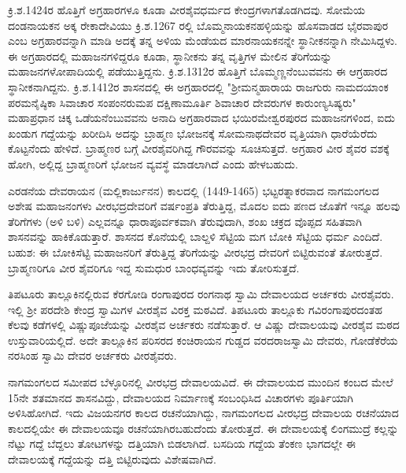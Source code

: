 ಕ್ರಿ.ಶ.1424ರ ಹೊತ್ತಿಗೆ ಅಗ್ರಹಾರಗಳೂ ಕೂಡಾ ವೀರಶೈವಧರ್ಮದ ಕೇಂದ್ರಗಳಾಗತೊಡಗಿದವು. ಸೋಮೆಯ ದಂಡನಾಯಕನ ಅಕ್ಕ ರೇಕಾದೇವಿಯು ಕ್ರಿ.ಶ.1267 ರಲ್ಲಿ ಬೊಮ್ಮನಾಯಕನಹಳ್ಳಿಯನ್ನು ಹೊಸವಾಡದ ಭೈರವಾಪುರ ಎಂಬ ಅಗ್ರಹಾರವನ್ನಾಗಿ ಮಾಡಿ ಅದಕ್ಕೆ ತನ್ನ ಅಳಿಯ ಮೆಂಡೆಯದ ಮಾರನಾಯಕನನ್ನೇ ಸ್ಥಾನೀಕನನ್ನಾಗಿ ನೇಮಿಸಿದ್ದಳು. ಈ ಅಗ್ರಹಾರದಲ್ಲಿ ಮಹಾಜನಗಳಿದ್ದರೂ ಕೂಡಾ, ಸ್ಥಾನೀಕನು ತನ್ನ ವೃತ್ತಿಗಳ ಮೇಲಿನ ತೆರಿಗೆಯನ್ನು ಮಹಾಜನಗಳೋಪಾದಿಯಲ್ಲಿ ಪಡೆಯುತ್ತಿದ್ದನು. ಕ್ರಿ.ಶ.1312ರ ಹೊತ್ತಿಗೆ ಬೊಮ್ಮಣ್ಣನೆಂಬುವವನು ಈ ಆಗ್ರಹಾರದ ಸ್ಥಾನೀಕನಾಗಿದ್ದನು. ಕ್ರಿ.ಶ.\break 1412ರ ಶಾಸನದಲ್ಲಿ ಈ ಅಗ್ರಹಾರದಲ್ಲಿ "ಶ‍್ರೀಮನ್ಮಹಾರಾಯ ರಾಜಗುರು ನಾಮದಯಾಂಕ ಪರಮನೈಷ್ಠಿಕಾ ಸಿವಾಚಾರ ಸಂಪಂನರುಮಪ ದಕ್ಷಿಣಾಮೂರ್ತಿ ಶಿವಾಚಾರ ದೇವರುಗಳ ಕಾರುಂಣ್ಯಸಿಷ್ಯರು" ಮಹಾಪ್ರಧಾನ ಚಿಕ್ಕ ಒಡೆಯನೆಂಬುವವನು ಅನಾದಿ ಅಗ್ರಹಾರ\-ವಾದ ಭಯಿರಮೇಶ್ವರಪುರದ ಮಹಾಜನಗಳಿಂದ, ಐದು ಖಂಡುಗ ಗದ್ದೆಯನ್ನು ಖರೀದಿಸಿ ಅದನ್ನು ಬ್ರಾಹ್ಮಣ ಭೋಜನಕ್ಕೆ ಸೋಮನಾಥದೇವರ ವೃತ್ತಿಯಾಗಿ ಧಾರೆಯೆರೆದು ಕೊಟ್ಟನೆಂದು ಹೇಳಿದೆ. ಬ್ರಾಹ್ಮಣರ ಬಗ್ಗೆ ವೀರಶೈವರಿಗಿದ್ದ ಗೌರವವನ್ನು ಸೂಚಿಸುತ್ತದೆ. ಅಗ್ರಹಾರ ವೀರ ಶೈವರ ವಶಕ್ಕೆ ಹೋಗಿ, ಅಲ್ಲಿದ್ದ ಬ್ರಾಹ್ಮಣರಿಗೆ ಭೋಜನ ವ್ಯವಸ್ಥೆ ಮಾಡಲಾಗಿದೆ ಎಂದು ಹೇಳಬಹುದು.

ಎರಡನೆಯ ದೇವರಾಯನ (ಮಲ್ಲಿಕಾರ್ಜುನನ) ಕಾಲದಲ್ಲಿ (1449-1465) ಭಟ್ಟರತ್ನಾಕರವಾದ ನಾಗಮಂಗಲದ ಅಶೇಷ ಮಹಾಜನಂಗಳು ವೀರಭದ್ರದೇವರಿಗೆ ವರ್ಷಂಪ್ರತಿ ತೆರುತ್ತಿದ್ದ, ಮೊದಲ ಐದು ಪಣದ ಜೊತೆಗೆ ಇನ್ನೂ ಹಲವು ತೆರಿಗೆಗಳು (ಅಳಿ ಬಳಿ) ಎಲ್ಲವನ್ನೂ ಧಾರಾಪೂರ್ವಕವಾಗಿ ತೆರುವುದಾಗಿ, ಶಂಖ ಚಕ್ರದ ವೊಪ್ಪದ ಸಹಿತವಾಗಿ ಶಾಸನವನ್ನು ಹಾಕಿಕೊಡುತ್ತಾರೆ. ಶಾಸನದ ಕೊನೆಯಲ್ಲಿ ಬಾಲ್ದಳಿ ಸೆಟ್ಟಿಯ ಮಗ ಬೋಕಿ ಸೆಟ್ಟಿಯ ಧರ್ಮ ಎಂದಿದೆ. ಬಹುಶ: ಈ ಬೋಕಿಸೆಟ್ಟಿ ಮಹಾಜನರಿಗೆ ತೆರುತ್ತಿದ್ದ ತೆರಿಗೆಯನ್ನು ವೀರಭದ್ರ ದೇವರಿಗೆ ಬಿಟ್ಟಿರುವಂತೆ ತೋರುತ್ತದೆ. ಬ್ರಾಹ್ಮಣರಿಗೂ ವೀರ ಶೈವರಿಗೂ ಇದ್ದ ಸುಮಧುರ ಬಾಂಧವ್ಯವನ್ನು ಇದು ತೋರಿಸುತ್ತದೆ.

ತಿಪಟೂರು ತಾಲ್ಲೂಕಿನಲ್ಲಿರುವ ಕೆರಗೋಡಿ ರಂಗಾಪುರದ ರಂಗನಾಥ ಸ್ವಾಮಿ ದೇವಾಲಯದ ಅರ್ಚಕರು ವೀರಶೈವರು. ಇಲ್ಲಿ ಶ‍್ರೀ ಪರದೇಶಿ ಕೇಂದ್ರ ಸ್ವಾಮಿಗಳ ವೀರಶೈವ ವಿರಕ್ತ ಮಠವಿದೆ. ತಿಪಟೂರು ತಾಲ್ಲೂಕು ಗವಿರಂಗಾಪುರದಂತಹ ಕೆಲವು ಕಡೆಗಳಲ್ಲಿ ವಿಷ್ಣುಪೂಜೆಯನ್ನು ವೀರಶೈವ ಅರ್ಚಕರು ನಡೆಸುತ್ತಾರೆ. ಆ ವಿಷ್ಣು ದೇವಾಲಯವು ವೀರಶೈವ ಮಠದ ಉಸ್ತುವಾರಿಯಲ್ಲಿದೆ. ಅದೇ ತಾಲ್ಲೂಕಿನ ಪರಿಸರದ ಕಂಚಿರಾಯನ ಗುಡ್ಡದ ವರದರಾಜಸ್ವಾಮಿ ದೇವರು, ಗೋಡೆಕೆರೆಯ ನರಸಿಂಹ ಸ್ವಾಮಿ ದೇವರ ಅರ್ಚಕರು ವೀರಶೈವರು.

ನಾಗಮಂಗಲದ ಸಮೀಪದ ಬೆಳ್ಳೂರಿನಲ್ಲಿ ವೀರಭದ್ರ ದೇವಾಲಯವಿದೆ. ಈ ದೇವಾಲಯದ ಮುಂದಿನ ಕಂಬದ ಮೇಲೆ 15ನೇ ಶತಮಾನದ ಶಾಸನವಿದ್ದು, ದೇವಾಲಯದ ನಿರ್ಮಾಣಕ್ಕೆ ಸಂಬಂಧಿಸಿದ ವಿಚಾರಗಳು ಪೂರ್ತಿಯಾಗಿ ಅಳಿಸಿಹೋಗಿದೆ. ಇದು ವಿಜಯನಗರ ಕಾಲದ ರಚನೆಯಾಗಿದ್ದು, ನಾಗಮಂಗಲದ ವೀರಭದ್ರ ದೇವಾಲಯ ರಚನೆಯಾದ ಕಾಲದಲ್ಲಿಯೇ ಈ ದೇವಾಲಯವೂ ರಚನೆಯಾಗಿರಬಹುದೆಂದು ತೋರುತ್ತದೆ. ಈ ದೇವಾಲಯಕ್ಕೆ ಲಿಂಗಮುದ್ರೆ ಕಲ್ಲನ್ನು ನೆಟ್ಟು ಗದ್ದೆ ಬೆದ್ದಲು ತೋಟಗಳನ್ನು ದತ್ತಿಯಾಗಿ ಬಿಡಲಾಗಿದೆ. ಬಸದಿಯ ಗದ್ದೆಯ ತೆಂಕಣ ಭಾಗದಲ್ಲೇ ಈ ದೇವಾಲಯಕ್ಕೆ ಗದ್ದೆಯನ್ನು ದತ್ತಿ ಬಿಟ್ಟಿರುವುದು ವಿಶೇಷವಾಗಿದೆ.

